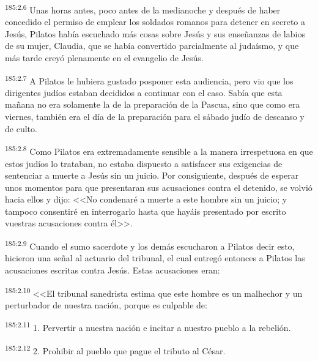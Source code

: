 \par 
\textsuperscript{185:2.6} Unas horas antes, poco antes de la medianoche y después de haber concedido el permiso de emplear los soldados romanos para detener en secreto a Jesús, Pilatos había escuchado más cosas sobre Jesús y sus enseñanzas de labios de su mujer, Claudia, que se había convertido parcialmente al judaísmo, y que más tarde creyó plenamente en el evangelio de Jesús.

\par 
\textsuperscript{185:2.7} A Pilatos le hubiera gustado posponer esta audiencia, pero vio que los dirigentes judíos estaban decididos a continuar con el caso. Sabía que esta mañana no era solamente la de la preparación de la Pascua, sino que como era viernes, también era el día de la preparación para el sábado judío de descanso y de culto.

\par 
\textsuperscript{185:2.8} Como Pilatos era extremadamente sensible a la manera irrespetuosa en que estos judíos lo trataban, no estaba dispuesto a satisfacer sus exigencias de sentenciar a muerte a Jesús sin un juicio. Por consiguiente, después de esperar unos momentos para que presentaran sus acusaciones contra el detenido, se volvió hacia ellos y dijo: <<No condenaré a muerte a este hombre sin un juicio; y tampoco consentiré en interrogarlo hasta que hayáis presentado por escrito vuestras acusaciones contra él>>.

\par 
\textsuperscript{185:2.9} Cuando el sumo sacerdote y los demás escucharon a Pilatos decir esto, hicieron una señal al actuario del tribunal, el cual entregó entonces a Pilatos las acusaciones escritas contra Jesús. Estas acusaciones eran:

\par 
\textsuperscript{185:2.10} <<El tribunal sanedrista estima que este hombre es un malhechor y un perturbador de nuestra nación, porque es culpable de:

\par 
\textsuperscript{185:2.11} 1. Pervertir a nuestra nación e incitar a nuestro pueblo a la rebelión.

\par 
\textsuperscript{185:2.12} 2. Prohibir al pueblo que pague el tributo al César.


